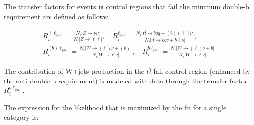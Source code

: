 The transfer factors for events in control regions that fail the minimum double-b requirement are defined as follows:

\begin{gather}
  R_i^{\ell\ell_{fail}} = \frac{N_i\big[Z\rightarrow\nu\nu\big]}{N_i\big[Z\rightarrow\ell\ell\big]}, \quad
  R_i^{\ell_{fail}} = \frac{N_i\big[t\bar{t}\rightarrow bqq+(b)(\ell)\nu\big]}{N_i\big[t\bar{t}\rightarrow bqq+b\ell\nu\big]}, \quad \nonumber \\
  R_i^{(b)\ell_{fail}} = \frac{N_i\big[W\rightarrow(\ell)\nu+(b)\big]}{N_i\big[W\rightarrow\ell\nu\big]}, \quad
  R_i^{b\ell_{fail}} = \frac{N_i\big[W\rightarrow(\ell)\nu+b\big]}{N_i\big[W\rightarrow\ell\nu\big]}
\label{eq:transfers}
\end{gather}

The contribution of W+jets production in the $t\bar{t}$ fail control region (enhanced by the anti-double-b requirement) is modeled with data through the transfer factor $R_i^{b\ell_{fail}}$.


The expression for the likelihood that is maximized by the fit for a single category is:

